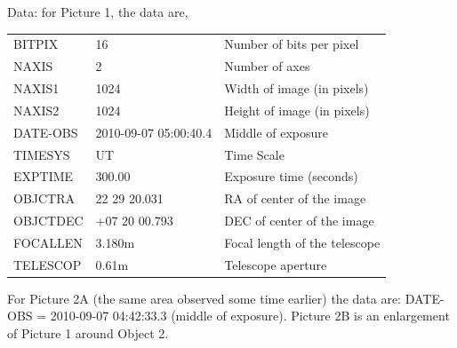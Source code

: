 Data: for Picture 1, the data are,

\begin{center}
\begin{tabular}{lll}
BITPIX & 16 & Number of bits per pixel \\
NAXIS & 2 & Number of axes \\
NAXIS1 & 1024 & Width of image (in pixels) \\
NAXIS2 & 1024 & Height of image (in pixels) \\
DATE-OBS & 2010-09-07 05:00:40.4 & Middle of exposure \\
TIMESYS & UT & Time Scale \\
EXPTIME & 300.00 & Exposure time (seconds) \\
OBJCTRA & 22 29 20.031 & RA of center of the image \\
OBJCTDEC & +07 20 00.793 & DEC of center of the image \\
FOCALLEN & 3.180m & Focal length of the telescope \\
TELESCOP & 0.61m & Telescope aperture \\
\end{tabular}
\end{center}


For Picture 2A (the same area observed some time earlier) the data are:
DATE-OBS = 2010-09-07 04:42:33.3 (middle of exposure). Picture 2B is an
enlargement of Picture 1 around Object 2.


